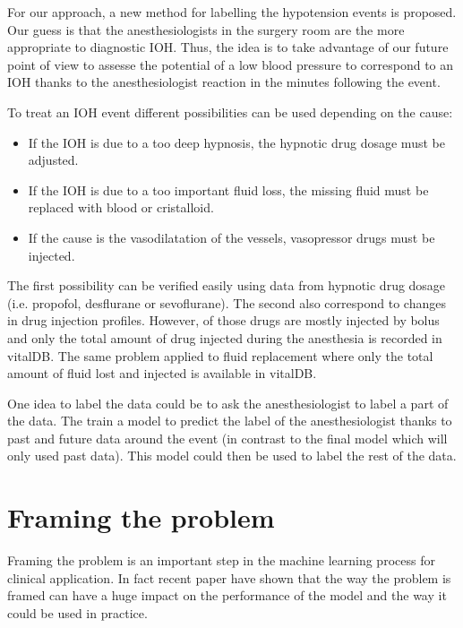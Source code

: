 \documentclass[a4paper,12pt]{article}
\begin{document}
For our approach, a new method for labelling the hypotension events is proposed. Our guess is that the anesthesiologists in the surgery room are the more appropriate to diagnostic IOH. Thus, the idea is to take advantage of our future point of view to assesse the potential of a low blood pressure to correspond to an IOH thanks to the anesthesiologist reaction in the minutes following the event. \medskip

To treat an IOH event different possibilities can be used depending on the cause:
\begin{itemize}
    \item If the IOH is due to a too deep hypnosis, the hypnotic drug dosage must be adjusted.
    \item If the IOH is due to a too important fluid loss, the missing fluid must be replaced with blood or cristalloid.
    \item If the cause is the vasodilatation of the vessels, vasopressor drugs must be injected.
\end{itemize}

The first possibility can be verified easily using data from hypnotic drug dosage (i.e. propofol, desflurane or sevoflurane). The second also correspond to changes in drug injection profiles. However, of those drugs are mostly injected by bolus and only the total amount of drug injected during the anesthesia is recorded in vitalDB. The same problem applied to fluid replacement where only the total amount of fluid lost and injected is available in vitalDB. \medskip

One idea to label the data could be to ask the anesthesiologist to label a part of the data. The train a model to predict the label of the anesthesiologist thanks to past and future data around the event (in contrast to the final model which will only used past data). This model could then be used to label the rest of the data. \medskip


\section{Framing the problem}

Framing the problem is an important step in the machine learning process for clinical application. In fact recent paper \cite{lauritsenFramingMachineLearning2021} have shown that the way the problem is framed can have a huge impact on the performance of the model and the way it could be used in practice. \medskip
\end{document}
